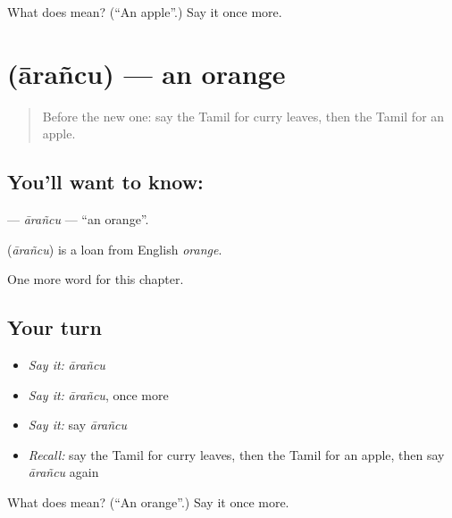 \begin{tcolorbox}[breakable,colback=teal!4,colframe=teal!35!black,title={Before you move on}]
What does  mean? (\textquotedblleft{}An apple\textquotedblright{}.) Say it once more.
\end{tcolorbox}
\section[\texorpdfstring{\ta{ஆரஞ்சு} (ārañcu)}{ஆரஞ்சு (ārañcu)}]{ (ārañcu) — an orange}

\label{lesson:TA-C271-arancu}



\begin{quote}
Before the new one: say the Tamil for curry leaves, then the Tamil for an apple.
\end{quote}

\subsection*{You'll want to know: }
\textbf{} — \emph{ārañcu} — \textquotedblleft{}an orange\textquotedblright{}.

\begin{cousinweb}
\textbf{} (\emph{ārañcu}) is a loan from English \emph{orange}.
\end{cousinweb}

\begin{grammarlens}[title={What you've built}]
One more word for this chapter.
\end{grammarlens}

\subsection*{Your turn}
\begin{itemize}
\raggedright
  \item \emph{Say it:} \emph{ārañcu}
  \item \emph{Say it:} \emph{ārañcu}, once more
  \item \emph{Say it:} say \emph{ārañcu}
  \item \emph{Recall:} say the Tamil for curry leaves, then the Tamil for an apple, then say \emph{ārañcu} again
\end{itemize}

\begin{tcolorbox}[breakable,colback=teal!4,colframe=teal!35!black,title={Before you move on}]
What does  mean? (\textquotedblleft{}An orange\textquotedblright{}.) Say it once more.
\end{tcolorbox}
